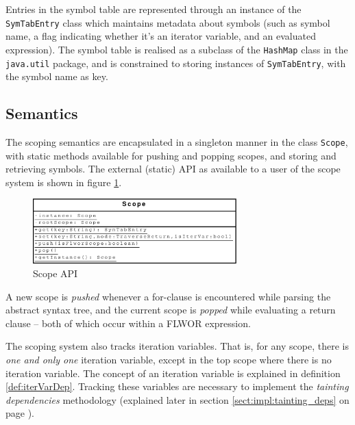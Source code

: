 Entries in the symbol table are represented through an instance of the
\texttt{SymTabEntry} class which maintains metadata about symbols (such as
symbol name, a flag indicating whether it's an iterator variable, and an
evaluated expression). The symbol table is realised as a subclass of the
\texttt{HashMap} class in the \texttt{java.util} package, and is constrained to
storing instances of \texttt{SymTabEntry}, with the symbol name as key.

\subsection{Semantics}
The scoping semantics are encapsulated in a singleton manner in the class
\texttt{Scope}, with static methods available for pushing and popping scopes,
and storing and retrieving symbols. The external (static) API as available to a
user of the scope system is shown in figure \ref{fig:impl:scope_uml}.

\begin{figure}[!htp]
\begin{center}
  \includegraphics[width=0.7\textwidth]{diagrams/scope_uml}
  \caption{Scope API}
  \label{fig:impl:scope_uml}
\end{center}
\end{figure}

A new scope is \textit{pushed} whenever a for-clause is encountered while
parsing the abstract syntax tree, and the current scope is \textit{popped} while
evaluating a return clause -- both of which occur within a FLWOR expression.

The scoping system also tracks iteration variables. That is, for any scope,
there is \textit{one and only one} iteration variable, except in the top scope
where there is no iteration variable. The concept of an iteration variable is
explained in definition \ref{def:iterVarDep}. Tracking these
variables are necessary to implement the \textit{tainting dependencies}
methodology (explained later in section \ref{sect:impl:tainting_deps} on page
\pageref{sect:impl:tainting_deps}).